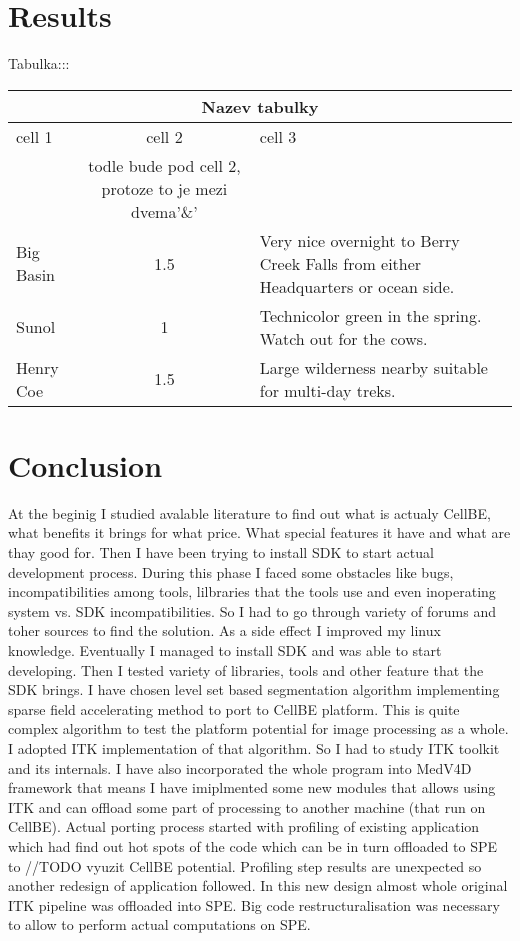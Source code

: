 \chapter{Results}
Tabulka:::
\begin{center}
\begin{tabular}{|l|c|p{3.5in}|}
\hline
\multicolumn{3}{|c|}{Nazev tabulky}\\ 
\hline cell 1&cell 2&cell 3\\&todle bude pod cell 2, protoze to je mezi dvema'\&' &\\ 
\hline Big Basin&1.5&Very nice overnight to Berry Creek Falls from
either Headquarters or ocean side.\\ 
\hline Sunol&1&Technicolor green in the spring. Watch out for the cows.\\ 
\hline Henry Coe&1.5&Large wilderness nearby suitable for multi-day treks.\\ 
\hline
\end{tabular}
\end{center}

\chapter{Conclusion}

At the beginig I studied avalable literature to find out what is actualy
CellBE, what benefits it brings for what price. What special features it have
and what are thay good for. Then I have been trying to install SDK to start
actual development process. During this phase I faced some obstacles like bugs,
incompatibilities among tools, lilbraries that the tools use and even
inoperating system vs. SDK incompatibilities. So I had to go through
variety of forums and toher sources to find the solution. As a side
effect I improved my linux knowledge. Eventually
I managed to install SDK and was able to start developing. Then I tested
variety of libraries, tools and other feature that the SDK brings.
I have chosen level set based segmentation algorithm implementing sparse field
accelerating method to
port to CellBE platform. This is quite complex algorithm to test the platform
potential for image processing as a whole. I adopted ITK implementation of that
algorithm. So I had to study ITK toolkit and its internals. I have also
incorporated the whole program into MedV4D framework that means I have
imiplmented some new modules that allows using ITK and can offload some part of
processing to another machine (that run on CellBE).
Actual porting process started with profiling of existing application which had
find out hot spots of the code which can be in turn offloaded to SPE to //TODO
vyuzit CellBE potential.
Profiling step results are unexpected so another redesign of application
followed. In this new design almost whole original ITK pipeline was offloaded
into SPE. Big code restructuralisation was necessary to allow to perform actual
computations on SPE.




